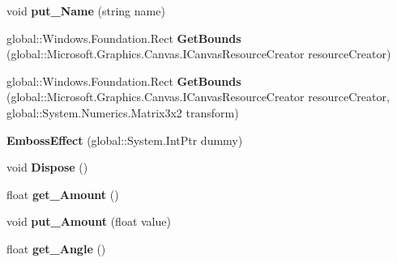 \begin{DoxyCompactItemize}
void {\bfseries put\+\_\+\+Name} (string name)
\item 
\mbox{\label{class_microsoft_1_1_graphics_1_1_canvas_1_1_effects_1_1_emboss_effect_a447c5d2e98d82eee9645d76bf8645f44}} 
global\+::\+Windows.\+Foundation.\+Rect {\bfseries Get\+Bounds} (global\+::\+Microsoft.\+Graphics.\+Canvas.\+I\+Canvas\+Resource\+Creator resource\+Creator)
\item 
\mbox{\label{class_microsoft_1_1_graphics_1_1_canvas_1_1_effects_1_1_emboss_effect_a332e3f4203f0f5fc176b241c611be3b3}} 
global\+::\+Windows.\+Foundation.\+Rect {\bfseries Get\+Bounds} (global\+::\+Microsoft.\+Graphics.\+Canvas.\+I\+Canvas\+Resource\+Creator resource\+Creator, global\+::\+System.\+Numerics.\+Matrix3x2 transform)
\item 
\mbox{\label{class_microsoft_1_1_graphics_1_1_canvas_1_1_effects_1_1_emboss_effect_a2d3861da33bd9475d1e949275788def0}} 
{\bfseries Emboss\+Effect} (global\+::\+System.\+Int\+Ptr dummy)
\item 
\mbox{\label{class_microsoft_1_1_graphics_1_1_canvas_1_1_effects_1_1_emboss_effect_aa39c97e030897236bc8071c5e9c5de62}} 
void {\bfseries Dispose} ()
\item 
\mbox{\label{class_microsoft_1_1_graphics_1_1_canvas_1_1_effects_1_1_emboss_effect_ad824b28bb284838b16307bbffbeb0668}} 
float {\bfseries get\+\_\+\+Amount} ()
\item 
\mbox{\label{class_microsoft_1_1_graphics_1_1_canvas_1_1_effects_1_1_emboss_effect_a49add22dd56a5fa85ae8c613d6b7561c}} 
void {\bfseries put\+\_\+\+Amount} (float value)
\item 
\mbox{\label{class_microsoft_1_1_graphics_1_1_canvas_1_1_effects_1_1_emboss_effect_a26a7de6dacb9be149789779457828ed3}} 
float {\bfseries get\+\_\+\+Angle} ()

\end{DoxyCompactItemize}
